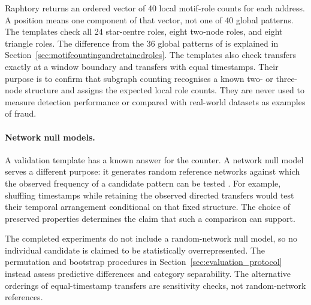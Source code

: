 Raphtory returns an ordered vector of 40 local motif-role counts for each
address. A position means one component of that vector, not one of 40 global
patterns. The templates check all 24 star-centre roles, eight two-node roles,
and eight triangle roles. The difference from the 36 global patterns of
\citet{paranjape2017motifs} is explained in
Section~\ref{sec:motifcountingandretainedroles}. The templates also check
transfers exactly at a window boundary and transfers with equal timestamps.
Their purpose is to confirm that subgraph counting recognises a known two- or
three-node structure and assigns the expected local role counts. They are
never used to measure detection performance or compared with real-world
datasets as examples of fraud.

\paragraph{Network null models.}
A validation template has a known answer for the counter. A network null model
serves a different purpose: it generates random reference networks against which
the observed frequency of a candidate pattern can be tested
\citep{milo2002network}. For example, shuffling timestamps while retaining the
observed directed transfers would test their temporal arrangement conditional
on that fixed structure. The choice of preserved properties determines the
claim that such a comparison can support.

The completed experiments do not include a random-network null model, so no
individual candidate is claimed to be statistically overrepresented. The
permutation and bootstrap procedures in
Section~\ref{sec:evaluation_protocol} instead assess predictive differences and
category separability. The alternative orderings of equal-timestamp transfers
are sensitivity checks, not random-network references.

